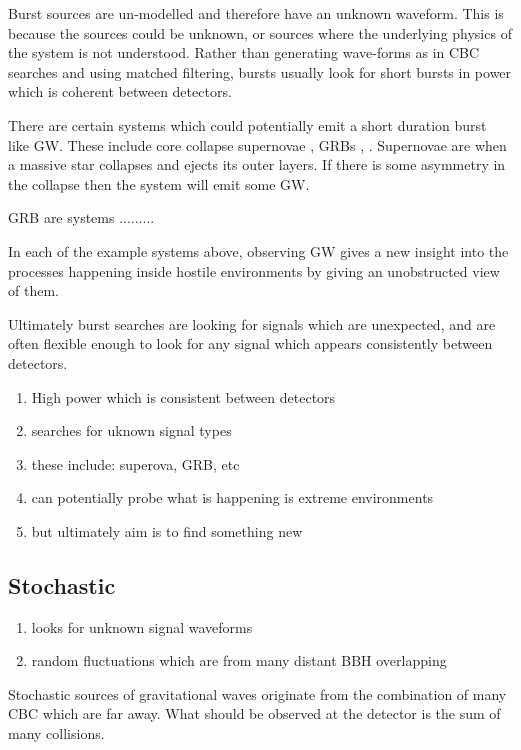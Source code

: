 Burst sources are un-modelled and therefore have an unknown waveform.
This is because the sources could be unknown, or sources where the underlying physics of the system is not understood. 
Rather than generating wave-forms as in \ac{CBC} searches and using matched filtering, bursts usually look for short bursts in power which is coherent between detectors.

There are certain systems which could potentially emit a short duration burst like \ac{GW}.
These include core collapse supernovae \cite{}, \acp{GRB} \cite{}, .
Supernovae are when a massive star collapses and ejects its outer layers. 
If there is some asymmetry in the collapse then the system will emit some \ac{GW}.

\ac{GRB} are systems .........

In each of the example systems above, observing \ac{GW} gives a new insight into the processes happening inside hostile environments by giving an unobstructed view of them.

Ultimately burst searches are looking for signals which are unexpected, and are often flexible enough to look for any signal which appears consistently between detectors.

\begin{enumerate}
    \item High power which is consistent between detectors
    \item searches for uknown signal types
    \item these include: superova, GRB, etc
    \item can potentially probe what is happening is extreme environments
    \item but ultimately aim is to find something new
\end{enumerate}


\subsection{Stochastic}

\begin{enumerate}
    \item looks for unknown signal waveforms
    \item random fluctuations which are from many distant BBH overlapping
\end{enumerate}
Stochastic sources of gravitational waves originate from the combination of many \ac{CBC} which are far away. What should be observed at the detector is the sum of many collisions. 

